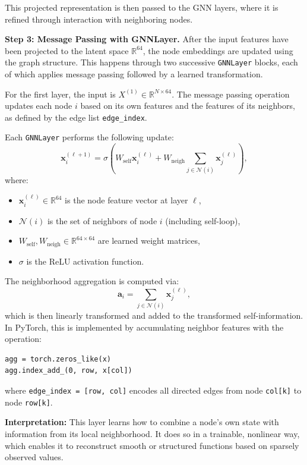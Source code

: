 This projected representation is then passed to the GNN layers, where it is refined through interaction with neighboring nodes.

%
{\bf Step 3: Message Passing with GNNLayer.} After the input features have been projected to the latent space $\mathbb{R}^{64}$, the node embeddings are updated using the graph structure. This happens through two successive {\tt GNNLayer} blocks, each of which applies message passing followed by a learned transformation.

For the first layer, the input is $X^{(1)} \in \mathbb{R}^{N \times 64}$. The message passing operation updates each node $i$ based on its own features and the features of its neighbors, as defined by the edge list {\tt edge\_index}.

\medskip
Each {\tt GNNLayer} performs the following update:
\[
\mathbf{x}_i^{(\ell+1)} = \sigma\left(
W_{\text{self}} \mathbf{x}_i^{(\ell)} +
W_{\text{neigh}} \sum_{j \in \mathcal{N}(i)} \mathbf{x}_j^{(\ell)}
\right),
\]
where:
\begin{itemize}
  \item $\mathbf{x}_i^{(\ell)} \in \mathbb{R}^{64}$ is the node feature vector at layer $\ell$,
  \item $\mathcal{N}(i)$ is the set of neighbors of node $i$ (including self-loop),
  \item $W_{\text{self}}, W_{\text{neigh}} \in \mathbb{R}^{64 \times 64}$ are learned weight matrices,
  \item $\sigma$ is the ReLU activation function.
\end{itemize}

The neighborhood aggregation is computed via:
\[
\mathbf{a}_i = \sum_{j \in \mathcal{N}(i)} \mathbf{x}_j^{(\ell)},
\]
which is then linearly transformed and added to the transformed self-information. In PyTorch, this is implemented by accumulating neighbor features with the operation:
\begin{verbatim}
agg = torch.zeros_like(x)
agg.index_add_(0, row, x[col])
\end{verbatim}
where {\tt edge\_index = [row, col]} encodes all directed edges from node {\tt col[k]} to node {\tt row[k]}.

\medskip
{\bf Interpretation:} This layer learns how to combine a node's own state with information from its local neighborhood. It does so in a trainable, nonlinear way, which enables it to reconstruct smooth or structured functions based on sparsely observed values.

